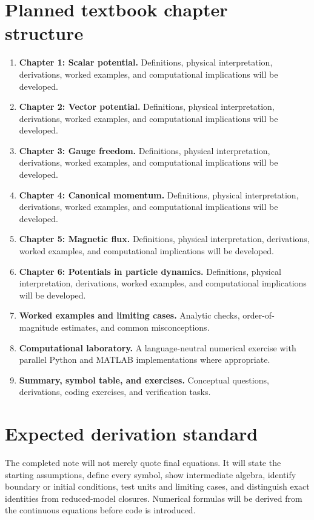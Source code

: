 \documentclass[11pt]{article}
\begin{document}
\section{Planned textbook chapter structure}
\begin{enumerate}[leftmargin=1.8em]
\item \textbf{Chapter 1: Scalar potential.} Definitions, physical interpretation, derivations, worked examples, and computational implications will be developed.
\item \textbf{Chapter 2: Vector potential.} Definitions, physical interpretation, derivations, worked examples, and computational implications will be developed.
\item \textbf{Chapter 3: Gauge freedom.} Definitions, physical interpretation, derivations, worked examples, and computational implications will be developed.
\item \textbf{Chapter 4: Canonical momentum.} Definitions, physical interpretation, derivations, worked examples, and computational implications will be developed.
\item \textbf{Chapter 5: Magnetic flux.} Definitions, physical interpretation, derivations, worked examples, and computational implications will be developed.
\item \textbf{Chapter 6: Potentials in particle dynamics.} Definitions, physical interpretation, derivations, worked examples, and computational implications will be developed.
\item \textbf{Worked examples and limiting cases.} Analytic checks, order-of-magnitude estimates, and common misconceptions.
\item \textbf{Computational laboratory.} A language-neutral numerical exercise with parallel Python and MATLAB implementations where appropriate.
\item \textbf{Summary, symbol table, and exercises.} Conceptual questions, derivations, coding exercises, and verification tasks.
\end{enumerate}

\section{Expected derivation standard}
The completed note will not merely quote final equations. It will state the starting assumptions, define every symbol, show intermediate algebra, identify boundary or initial conditions, test units and limiting cases, and distinguish exact identities from reduced-model closures. Numerical formulas will be derived from the continuous equations before code is introduced.
\end{document}
